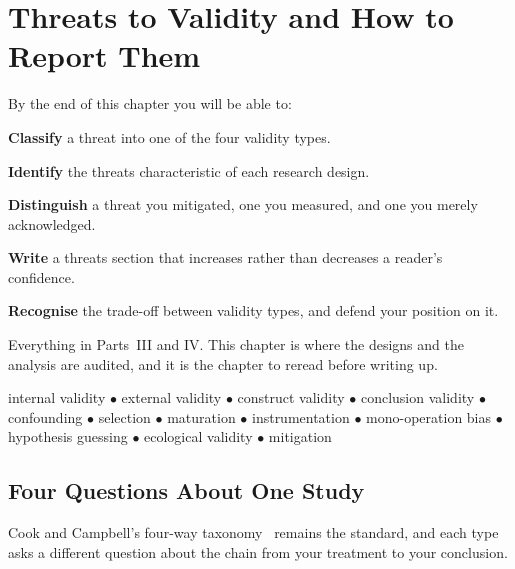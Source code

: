 \chapter{Threats to Validity and How to Report Them}\label{ch:validity}

\begin{outcomes}
By the end of this chapter you will be able to:
\begin{tight}
  \item \textbf{Classify} a threat into one of the four validity types.
  \item \textbf{Identify} the threats characteristic of each research design.
  \item \textbf{Distinguish} a threat you mitigated, one you measured, and one
    you merely acknowledged.
  \item \textbf{Write} a threats section that increases rather than decreases a
    reader's confidence.
  \item \textbf{Recognise} the trade-off between validity types, and defend
    your position on it.
\end{tight}
\end{outcomes}

\begin{prereq}
Everything in Parts~III and IV. This chapter is where the designs and the
analysis are audited, and it is the chapter to reread before writing up.
\end{prereq}

\begin{keyterms}
internal validity $\bullet$ external validity $\bullet$ construct validity
$\bullet$ conclusion validity $\bullet$ confounding $\bullet$ selection
$\bullet$ maturation $\bullet$ instrumentation $\bullet$ mono-operation bias
$\bullet$ hypothesis guessing $\bullet$ ecological validity $\bullet$
mitigation
\end{keyterms}

\section{Four Questions About One Study}

Cook and Campbell's four-way taxonomy~\cite{cook1979quasi} remains the standard,
and each type asks a different question about the chain from your treatment to
your conclusion.

